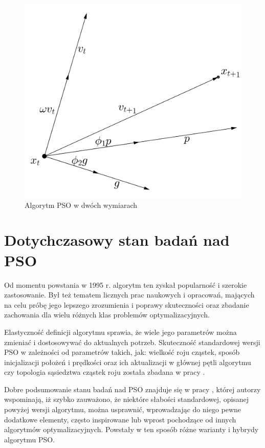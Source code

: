 \documentclass[12pt, twoside, openany, abstract=on]{report}
\theoremstyle{definition}
\begin{document}
\begin{figure}[H]
    \centering
 \includegraphics[scale=0.2]{PSO2D.png}
 \caption{Algorytm PSO w dwóch wymiarach}
\end{figure}

\section{Dotychczasowy stan badań nad PSO}

Od momentu powstania w 1995 r. algorytm ten zyskał popularność i szerokie zastosowanie. Był też tematem licznych prac naukowych i opracowań, mających na celu próbę jego lepszego zrozumienia i poprawy skuteczności oraz zbadanie zachowania dla wielu różnych klas problemów optymalizacyjnych.

Elastyczność definicji algorytmu sprawia, że wiele jego parametrów 
można zmieniać i dostosowywać do aktualnych potrzeb. Skuteczność standardowej wersji PSO 
w zależności od parametrów takich, jak: wielkość roju cząstek, sposób inicjalizacji położeń i prędkości oraz ich aktualizacji w głównej pętli algorytmu czy topologia sąsiedztwa cząstek roju została zbadana w pracy \cite{SPso}. 

Dobre podsumowanie stanu badań nad PSO znajduje się w pracy \cite{ComprLearnPso}, której autorzy wspominają, iż szybko zauważono, że niektóre słabości standardowej, opisanej powyżej wersji algorytmu, można usprawnić, wprowadzając do niego pewne dodatkowe elementy, często inspirowane lub wprost pochodzące od innych algorytmów optymalizacyjnych. Powstały w ten sposób różne warianty i hybrydy algorytmu PSO.
\end{document}
